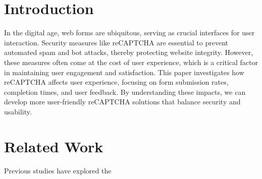 \section{Introduction}
In the digital age, web forms are ubiquitous, serving as crucial interfaces for user interaction. Security measures like reCAPTCHA are essential to prevent automated spam and bot attacks, thereby protecting website integrity. However, these measures often come at the cost of user experience, which is a critical factor in maintaining user engagement and satisfaction. This paper investigates how reCAPTCHA affects user experience, focusing on form submission rates, completion times, and user feedback. By understanding these impacts, we can develop more user-friendly reCAPTCHA solutions that balance security and usability.

\section{Related Work}
Previous studies have explored the
